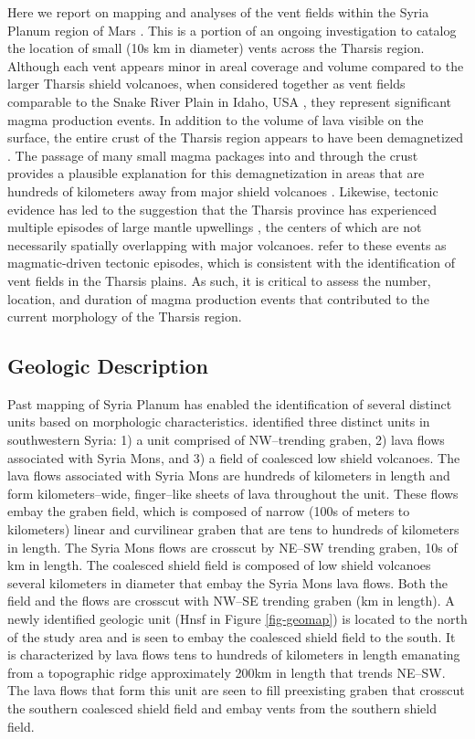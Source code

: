 \documentclass[preprint,review,authoryear,12pt]{elsarticle}
\begin{document}
Here we report on mapping and analyses of the vent fields within the Syria Planum region of Mars \citep{Baptista2008}. This is a portion of an ongoing investigation to catalog the location of small (10s km in diameter) vents across the Tharsis region.  Although each vent appears minor in areal coverage and volume compared to the larger Tharsis shield volcanoes, when considered together as vent fields comparable to the Snake River Plain in Idaho, USA \citep{Greeley1977,Greeley1982}, they represent significant magma production events. In addition to the volume of lava visible on the surface, the entire crust of the Tharsis region appears to have been demagnetized \citep{Connerney2005,Lillis2006}. The passage of many small magma packages into and through the crust provides a plausible explanation for this demagnetization in areas that are hundreds of kilometers away from major shield volcanoes \citep{Lillis2009}.  Likewise, tectonic evidence has led to the suggestion that the Tharsis province has experienced multiple episodes of large mantle upwellings \citep{Plescia1982,Mege1996,Anderson2001,Anderson2004,Wilson2002}, the centers of which are not necessarily spatially overlapping with major volcanoes.  \citet{Anderson2001,Anderson2004} refer to these events as magmatic-driven tectonic episodes, which is consistent with the identification of vent fields in the Tharsis plains.  As such, it is critical to assess the number, location, and duration of magma production events that contributed to the current morphology of the Tharsis region.

\subsection{Geologic Description}

Past mapping of Syria Planum has enabled the identification of several distinct units based on morphologic characteristics. \citet{Baptista2008} identified three distinct units in southwestern Syria: 1) a unit comprised of NW--trending graben, 2) lava flows associated with Syria Mons, and 3) a field of coalesced low shield volcanoes. The lava flows associated with Syria Mons are hundreds of kilometers in length and form kilometers--wide, finger--like sheets of lava throughout the unit. These flows embay the graben field, which is composed of narrow (100s of meters to kilometers) linear and curvilinear graben that are tens to hundreds of kilometers in length. The Syria Mons flows are crosscut by NE--SW trending graben, 10s of km in length. The coalesced shield field is composed of low shield volcanoes several kilometers in diameter that embay the Syria Mons lava flows. Both the field and the flows are crosscut with NW--SE trending graben (km in length). A newly identified geologic unit (Hnsf in Figure \ref{fig-geomap}) is located to the north of the \citet{Baptista2008} study area and is seen to embay the coalesced shield field to the south. It is characterized by lava flows tens to hundreds of kilometers in length emanating from a topographic ridge approximately 200km in length that trends NE--SW. The lava flows that form this unit are seen to fill preexisting graben that crosscut the southern coalesced shield field and embay vents from the southern shield field.
\end{document}
